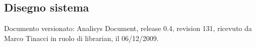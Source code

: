 \subsection{Disegno sistema}
Documento versionato: Analisys Document, release 0.4, revision 131, ricevuto da
Marco Tinacci in ruolo di librarian, il 06/12/2009.